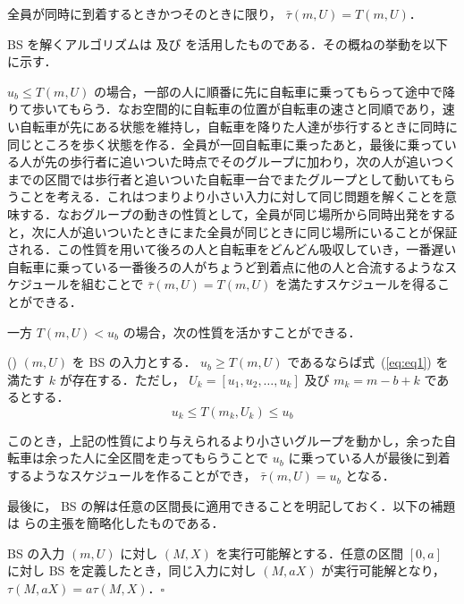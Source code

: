 \begin{corollary}\label{corollary:lower-bound-bs-equality}
  全員が同時に到着するときかつそのときに限り， $\bar\tau(m, U) = T(m, U)$．
\end{corollary}

BS を解くアルゴリズムは  及び  を活用したものである．その概ねの挙動を以下に示す．

$u_b \leq T(m, U)$ の場合，一部の人に順番に先に自転車に乗ってもらって途中で降りて歩いてもらう．なお空間的に自転車の位置が自転車の速さと同順であり，速い自転車が先にある状態を維持し，自転車を降りた人達が歩行するときに同時に同じところを歩く状態を作る．全員が一回自転車に乗ったあと，最後に乗っている人が先の歩行者に追いついた時点でそのグループに加わり，次の人が追いつくまでの区間では歩行者と追いついた自転車一台でまたグループとして動いてもらうことを考える．これはつまりより小さい入力に対して同じ問題を解くことを意味する．なおグループの動きの性質として，全員が同じ場所から同時出発をすると，次に人が追いついたときにまた全員が同じときに同じ場所にいることが保証される．この性質を用いて後ろの人と自転車をどんどん吸収していき，一番遅い自転車に乗っている一番後ろの人がちょうど到着点に他の人と合流するようなスケジュールを組むことで $\bar\tau(m, U) = T(m, U)$ を満たすスケジュールを得ることができる．

一方 $T(m, U) < u_b$ の場合，次の性質を活かすことができる．
\begin{lemma} (\textcite{czyzowicz})\label{lemma:bs-subgroup}
  $(m, U)$ を BS の入力とする． $u_b \geq T(m, U)$ であるならば式~(\ref{eq:eq1}) を満たす $k$ が存在する．ただし， $U_k = [u_1, u_2, \ldots, u_{k}]$ 及び $m_k = m - b + k$ であるとする．
  \begin{equation}
    u_k \leq T(m_k, U_k) \leq u_b \label{eq:eq1}
  \end{equation}
\end{lemma}
このとき，上記の性質により与えられるより小さいグループを動かし，余った自転車は余った人に全区間を走ってもらうことで $u_b$ に乗っている人が最後に到着するようなスケジュールを作ることができ， $\bar\tau(m, U) = u_b$ となる．

最後に， BS の解は任意の区間長に適用できることを明記しておく．以下の補題は \textcite{czyzowicz} らの主張を簡略化したものである．
\begin{claim}\label{claim:bs-scalable}
  BS の入力 $(m, U)$ に対し $(M, X)$ を実行可能解とする．任意の区間 $[0, a]$ に対し BS を定義したとき，同じ入力に対し $(M, aX)$ が実行可能解となり， $\tau(M, aX) = a\tau(M, X)$．\hfill $\square$
\end{claim}
